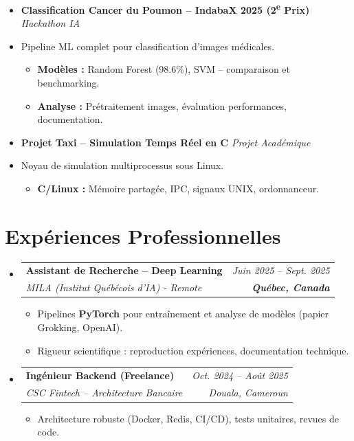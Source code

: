 \documentclass[a4paper,11pt]{article}
\makeatletter
\newcommand{\resumeSubheading}[4]{
  \vspace{-1pt}\item
    \begin{tabular*}{0.97\textwidth}[t]{l@{\extracolsep{\fill}}r}
      \textbf{#1} & \textit{\small #2} \\
      \textit{\small #3} & \textit{\small #4} \\
    \end{tabular*}\vspace{-5pt}
}
\makeatother
\begin{document}
\begin{itemize}[leftmargin=*, label={}]
\item \textbf{Classification Cancer du Poumon -- IndabaX 2025 (2\textsuperscript{e} Prix)} \hfill \textit{Hackathon IA}
\vspace{-2pt}
\item \small{Pipeline ML complet pour classification d'images médicales.}
    \begin{itemize}[leftmargin=0.4cm, nosep, label=\tiny$\bullet$]
        \item \small{\textbf{Modèles :} Random Forest (98.6\%), SVM -- comparaison et benchmarking.}
        \item \small{\textbf{Analyse :} Prétraitement images, évaluation performances, documentation.}
    \end{itemize}
    \vspace{3pt}

\item \textbf{Projet Taxi -- Simulation Temps Réel en C} \hfill \textit{Projet Académique}
\vspace{-2pt}
\item \small{Noyau de simulation multiprocessus sous Linux.}
    \begin{itemize}[leftmargin=0.4cm, nosep, label=\tiny$\bullet$]
        \item \small{\textbf{C/Linux :} Mémoire partagée, IPC, signaux UNIX, ordonnanceur.}
    \end{itemize}

\end{itemize}

\section{Expériences Professionnelles}
\begin{itemize}[leftmargin=*, label={}]

    \resumeSubheading
      {Assistant de Recherche -- Deep Learning}{Juin 2025 -- Sept. 2025}
      {MILA (Institut Québécois d'IA) - Remote}{\textbf{Québec, Canada}}
      \begin{itemize}[leftmargin=0.4cm, nosep, label=\tiny$\bullet$]
        \item \small{Pipelines \textbf{PyTorch} pour entraînement et analyse de modèles (papier Grokking, OpenAI).}
        \item \small{Rigueur scientifique : reproduction expériences, documentation technique.}
      \end{itemize}
    \vspace{2pt}

    \resumeSubheading
      {Ingénieur Backend (Freelance)}{Oct. 2024 -- Août 2025}
      {CSC Fintech -- Architecture Bancaire}{Douala, Cameroun}
      \begin{itemize}[leftmargin=0.4cm, nosep, label=\tiny$\bullet$]
        \item \small{Architecture robuste (Docker, Redis, CI/CD), tests unitaires, revues de code.}
      \end{itemize}
\end{itemize}
\end{document}

